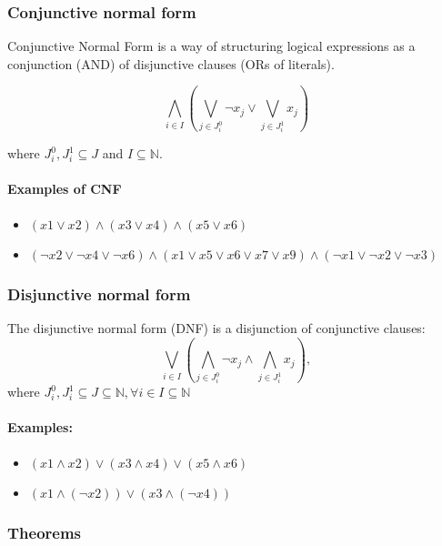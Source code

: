 \documentclass[12pt]{article}
\begin{document}
\subsubsection{Conjunctive normal form}

Conjunctive Normal Form is a way of structuring logical expressions as a conjunction (AND) of disjunctive clauses (ORs of literals).

\[
\bigwedge_{i \in I} \left( \bigvee_{j \in J_i^0} \neg x_j \vee \bigvee_{j \in J_i^1} x_j \right)
\]

where \( J_i^0, J_i^1 \subseteq J \) and \( I \subseteq \mathbb{N} \).

\paragraph{Examples of CNF}
\begin{itemize}
\item \((x1 \lor x2) \land (x3 \lor x4) \land (x5 \lor x6)\)
\item \((\neg x2 \lor \neg x4 \lor \neg x6) \land (x1 \lor x5 \lor x6 \lor x7 \lor x9) \land (\neg x1 \lor \neg x2 \lor \neg x3)\)
\end{itemize}

\subsubsection{Disjunctive normal form}

The disjunctive normal form (DNF) is a disjunction of conjunctive clauses:
\[
\bigvee_{i \in I} \left( \bigwedge_{j \in J_i^0} \neg x_j \land \bigwedge_{j \in J_i^1} x_j \right),
\]
where $J_i^0, J_i^1 \subseteq J \subseteq \mathbb{N}, \forall i \in I \subseteq \mathbb{N}$

\paragraph{Examples:}
\begin{itemize}
    \item $(x1 \land x2) \lor (x3 \land x4) \lor (x5 \land x6)$
    \item $(x1 \land (\neg x2)) \lor (x3 \land (\neg x4))$
\end{itemize}

\subsubsection{Theorems}
\end{document}

